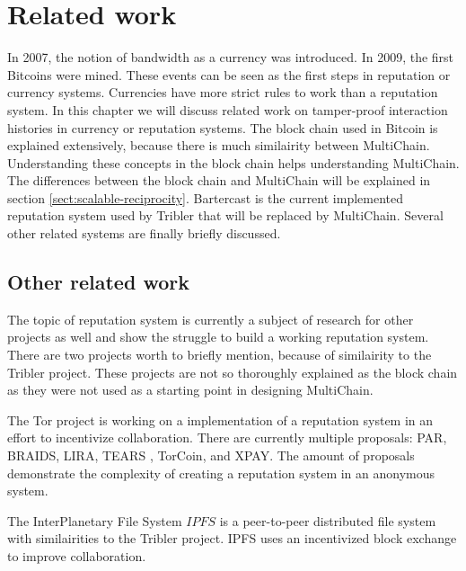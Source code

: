\chapter{Related work}
In 2007, the notion of bandwidth as a currency was introduced.
In 2009, the first Bitcoins were mined\cite{Blockchain.info-bcs}.
These events can be seen as the first steps in reputation or currency systems.
Currencies have more strict rules to work than a reputation system.
In this chapter we will discuss related work on tamper-proof interaction histories in currency or reputation systems.
The block chain used in Bitcoin is explained extensively,
because there is much similairity between MultiChain.
Understanding these concepts in the block chain helps understanding MultiChain.
The differences between the block chain and MultiChain will be explained in section \ref{sect:scalable-reciprocity}.
Bartercast is the current implemented reputation system used by Tribler that will be replaced by MultiChain.
Several other related systems are finally briefly discussed.





\section{Other related work}
The topic of reputation system is currently a subject of research for other projects as well
and show the struggle to build a working reputation system.
There are two projects worth to briefly mention, because of similairity to the Tribler project.
These projects are not so thoroughly explained as the block chain
as they were not used as a starting point in designing MultiChain.

The Tor project is working on a implementation of a reputation system in an effort to incentivize collaboration\cite{dingledine-torincentive}.
There are currently multiple proposals: PAR\cite{androulaki-torincentive}, BRAIDS\cite{jansen-braid}, LIRA\cite{jansen-lira}, TEARS \cite{jansen-torincentive}, TorCoin\cite{ghosh-torincentive}, and XPAY\cite{chen-torincentive}.
The amount of proposals demonstrate the complexity of creating a reputation system in an anonymous system.

The InterPlanetary File System \(IPFS\) is a peer-to-peer distributed file system with similairities to the Tribler project.
IPFS uses an incentivized block exchange to improve collaboration\cite{benet-ipfs}.